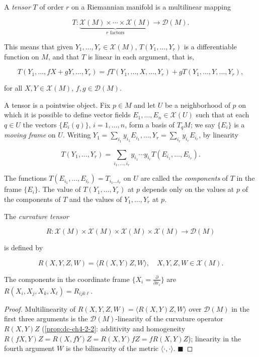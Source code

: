 \begin{definition}
  \label{def:dc-ch4-5-1}
  \leanok
  A \emph{tensor} $T$ of order $r$ on a Riemannian manifold is a multilinear mapping
  
  $$
  T:\underbrace{\mathcal{X}(M)\times\cdots\times\mathcal{X}(M)}_{r\text{ factors}}\to\mathcal{D}(M).
  $$
  
  This means that given $Y_1,\dots,Y_r\in\mathcal{X}(M)$, $T(Y_1,\dots,Y_r)$ is a
  differentiable function on $M$, and that $T$ is linear in each argument, that is,
  
  $$
  T(Y_1,\dots,fX+gY,\dots,Y_r)=fT(Y_1,\dots,X,\dots,Y_r)+gT(Y_1,\dots,Y,\dots,Y_r),
  $$
  
  for all $X,Y\in\mathcal{X}(M)$, $f,g\in\mathcal{D}(M)$.
  
  A tensor is a pointwise object. Fix $p\in M$ and let $U$ be a neighborhood of $p$
  on which it is possible to define vector fields $E_1,\dots,E_n\in\mathcal{X}(U)$
  such that at each $q\in U$ the vectors $\{E_i(q)\}$, $i=1,\dots,n$, form a basis of
  $T_qM$; we say $\{E_i\}$ is a \emph{moving frame} on $U$. Writing
  $Y_1=\sum_{i_1}y_{i_1}E_{i_1},\dots,Y_r=\sum_{i_r}y_{i_r}E_{i_r}$, by linearity
  
  $$
  T(Y_1,\dots,Y_r)=\sum_{i_1,\dots,i_r}y_{i_1}\cdots y_{i_r}T(E_{i_1},\dots,E_{i_r}).
  $$
  
  The functions $T(E_{i_1},\dots,E_{i_r})=T_{i_1\dots i_r}$ on $U$ are called the
  \emph{components} of $T$ in the frame $\{E_i\}$. The value of $T(Y_1,\dots,Y_r)$ at $p$
  depends only on the values at $p$ of the components of $T$ and the values of
  $Y_1,\dots,Y_r$ at $p$.
\end{definition}

\begin{example}
  \label{ex:dc-ch4-5-2}
  \leanok
  The \emph{curvature tensor}

  $$
  R:\mathcal{X}(M)\times\mathcal{X}(M)\times\mathcal{X}(M)\times\mathcal{X}(M)\to\mathcal{D}(M)
  $$

  is defined by

  $$
  R(X,Y,Z,W)=\langle R(X,Y)Z,W\rangle,\quad X,Y,Z,W\in\mathcal{X}(M).
  $$

  The components in the coordinate frame $\{X_i=\frac{\partial}{\partial x_i}\}$
  are $R(X_i,X_j,X_k,X_\ell)=R_{ijk\ell}$.
\end{example}
\begin{proof}
  \leanok
  \sketch
  Multilinearity of $R(X,Y,Z,W)=\langle R(X,Y)Z,W\rangle$ over $\mathcal{D}(M)$
  in the first three arguments is the $\mathcal{D}(M)$-linearity of the curvature
  operator $R(X,Y)Z$ (\cref{prop:dc-ch4-2-2}: additivity and homogeneity
  $R(fX,Y)Z=R(X,fY)Z=R(X,Y)fZ=fR(X,Y)Z$); linearity in the fourth argument $W$
  is the bilinearity of the metric $\langle\cdot,\cdot\rangle$. $\blacksquare$
\end{proof}

